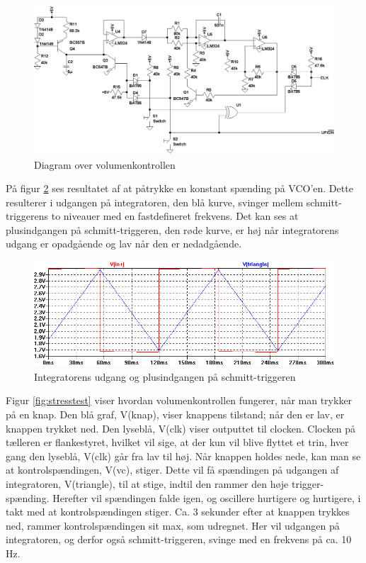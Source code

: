 \begin{figure}[h]
\centering
\includegraphics[width=\textwidth]{teknisk/volumenkontrol/diagram.png}
\caption{Diagram over volumenkontrollen}
\label{fig:volumenkontrol-diagram}
\end{figure}

På figur \ref{fig:vco-signal} ses resultatet af at påtrykke en konstant spænding på VCO'en. Dette resulterer i udgangen på integratoren, den blå kurve, svinger mellem schmitt-triggerens to niveauer med en fastdefineret frekvens. Det kan ses at plusindgangen på schmitt-triggeren, den røde kurve, er høj når integratorens udgang er opadgående og lav når den er nedadgående. 

\begin{figure}[h]
\centering
\includegraphics[width=\textwidth]{teknisk/volumenkontrol/vco-signal.png}
\caption{Integratorens udgang og plusindgangen på schmitt-triggeren}
\label{fig:vco-signal}
\end{figure}

Figur \ref{fig:stresstest} viser hvordan volumenkontrollen fungerer, når man trykker på en knap. Den blå graf, V(knap), viser knappens tilstand; når den er lav, er knappen trykket ned. Den lyseblå, V(clk) viser outputtet til clocken. Clocken på tælleren er flankestyret, hvilket vil sige, at der kun vil blive flyttet et trin, hver gang den lyseblå, V(clk) går fra lav til høj. Når knappen holdes nede, kan man se at kontrolspændingen, V(vc), stiger. Dette vil få spændingen på udgangen af integratoren, V(triangle), til at stige, indtil den rammer den høje trigger-spænding. Herefter vil spændingen falde igen, og oscillere hurtigere og hurtigere, i takt med at kontrolspændingen stiger. Ca. 3 sekunder efter at knappen trykkes ned, rammer kontrolspændingen sit max, som udregnet. Her vil udgangen på integratoren, og derfor også schmitt-triggeren, svinge med en frekvens på ca. 10 Hz.

